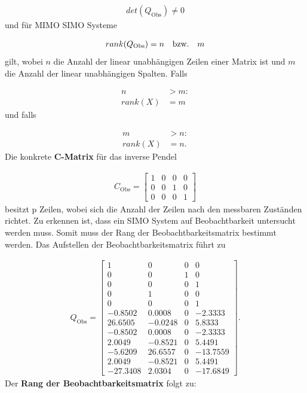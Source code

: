 \begin{align}
    det(Q_{\mathrm{Obs}}) \neq 0
\end{align}
\newline
und für MIMO \bzw SIMO Systeme

\begin{align}
    rank(Q_{\mathrm{Obs}}) = n \quad \text{bzw.} \quad m
\end{align}
\newline
gilt, wobei $n$ die Anzahl der linear unabhängigen Zeilen einer Matrix ist und $m$ die Anzahl der linear unabhängigen Spalten. Falls

\begin{align*}
    n &> m: \\
    rank(X) &= m
\end{align*}
\newline
und falls

\begin{align*}
    m &> n: \\
    rank(X) &= n.
\end{align*}
\newline
Die konkrete \textbf{C-Matrix} für das inverse Pendel

\begin{align}
    C_{\mathrm{Obs}} = 
    \begin{bmatrix}
        1 & 0 & 0 & 0 \\
        0 & 0 & 1 & 0 \\
        0 & 0 & 0 & 1
    \end{bmatrix}
\end{align}
\newline
besitzt p Zeilen, wobei sich die Anzahl der Zeilen nach den messbaren Zuständen richtet. Zu erkennen ist, dass ein SIMO System auf Beobachtbarkeit untersucht werden muss. Somit muss der Rang der Beobachtbarkeitsmatrix bestimmt werden. Das Aufstellen der Beobachtbarkeitsmatrix führt zu

\begin{align}
    Q_{\mathrm{Obs}} = 
    \begin{bmatrix}
        1 & 0 & 0 & 0 \\
        0 & 0 & 1 & 0 \\
        0 & 0 & 0 & 1 \\
        0 & 1 & 0 & 0 \\
        0 & 0 & 0 & 1 \\
        -0.8502 & 0.0008 & 0 & -2.3333 \\
       26.6505 & -0.0248 & 0 & 5.8333 \\
       -0.8502 & 0.0008 & 0 & -2.3333 \\
        2.0049 & -0.8521 & 0 & 5.4491 \\
       -5.6209 & 26.6557 & 0 & -13.7559 \\
        2.0049 & -0.8521 & 0 & 5.4491 \\
      -27.3408 & 2.0304 & 0 & -17.6849
    \end{bmatrix}.
\end{align}
\newline
Der \textbf{Rang der Beobachtbarkeitsmatrix} folgt zu:

